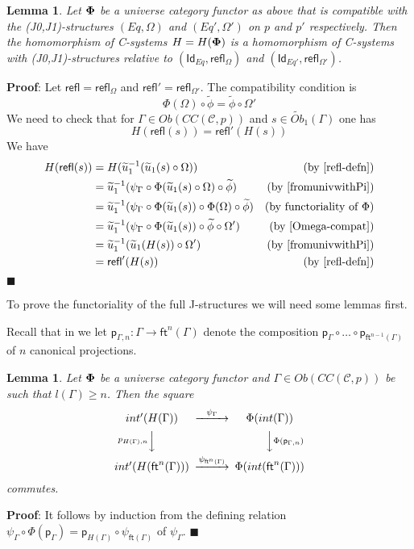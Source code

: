 \documentclass[12pt]{article}
\numberwithin{equation}{section}
\newenvironment{eq}{\begin{equation}}{\end{equation}}
\newenvironment{myproof}{{\bf Proof}:}{$\blacksquare$ \vskip 5mm }
\newtheorem{lemma}[proposition]{Lemma}
\newcommand{\by}[1]{\text{(by #1)}}
\newcommand{\sr}{\rightarrow}
\newcommand{\wt}{\widetilde}
\newcommand{\toCC}{CC} %
\newcommand{\C}{{\mathcal C}}  %
\newcommand{\ft}{\mathsf{ft}}
\newcommand{\p}{\mathsf{p}}
\newcommand{\Id}{\mathsf{Id}} %
\newcommand{\refl}{\mathsf{refl}}
\newcommand{\Obwt}{\wt{Ob}}
\begin{document}
\begin{lemma}
\label{2015.04.12.l2} Let ${\bf\Phi}$ be a universe category functor as above
that is compatible with the (J0,J1)-structures $(Eq,\Omega)$ and
$(Eq',\Omega')$ on $p$ and $p'$ respectively. Then the homomorphism of
C-systems $H=H({\bf\Phi})$ is a homomorphism of C-systems with
(J0,J1)-structures relative to $(\Id_{Eq},\refl_{\Omega})$ and
$(\Id_{Eq'},\refl_{\Omega'})$.
\end{lemma}
%
\begin{myproof}
Let $\refl=\refl_{\Omega}$ and $\refl'=\refl_{\Omega'}$. The compatibility
condition is
%
\begin{eq}
  \label{Omega-compat}
  \Phi(\Omega)\circ\wt{\phi}=\wt{\phi}\circ\Omega'
\end{eq}
%
We need to check that for $\Gamma\in Ob(\toCC({\C},p))$ and $s\in
\Obwt_1(\Gamma)$ one has
%
$$H(\refl(s))=\refl'(H(s))$$
%
We have
%
\begin{align*}
  H(\refl(s))
    & = H(\wt{u}_1^{-1}(\wt{u}_1(s)\circ\Omega)) & \by{\ref{refl-defn}} \\
    & = \wt{u}_1^{-1}(\psi_{\Gamma}\circ\Phi(\wt{u}_1(s)\circ\Omega)\circ\wt{\phi}) & \by{\cite[Lemma 6.1(2)]{fromunivwithPi}} \\
    & = \wt{u}_1^{-1}(\psi_{\Gamma}\circ\Phi(\wt{u}_1(s))\circ\Phi(\Omega)\circ \wt{\phi}) & \by{functoriality of $\Phi$} \\
    & = \wt{u}_1^{-1}(\psi_{\Gamma}\circ\Phi(\wt{u}_1(s))\circ\wt{\phi}\circ\Omega') & \by{\ref{Omega-compat}} \\
    & = \wt{u}_1^{-1}(\wt{u}_1(H(s))\circ\Omega') & \by{\cite[Lemma 6.1(2)]{fromunivwithPi}} \\
    & = \refl'(H(s)) & \by{\ref{refl-defn}}
\end{align*}
\end{myproof}
%

To prove the functoriality of the full J-structures we will need some lemmas
first.

Recall that in \cite{Csubsystems} we let $\p_{\Gamma,n}:\Gamma\sr \ft^n(\Gamma)$
denote the composition $\p_{\Gamma}\circ \dots\circ \p_{\ft^{n-1}(\Gamma)}$ of $n$ canonical projections.
%
\begin{lemma}
\label{2015.05.10.l1} Let ${\bf\Phi}$ be a universe category functor and
$\Gamma\in Ob(\toCC({\C},p))$ be such that $l(\Gamma)\ge n$. Then the
square
%
$$
\begin{CD}
int'(H(\Gamma)) @>\psi_{\Gamma}>> \Phi(int(\Gamma))\\ @Vp_{H(\Gamma),n} VV
@VV\Phi(\p_{\Gamma,n})V\\ int'(H(\ft^n(\Gamma))) @>\psi_{\ft^n(\Gamma)}>>
\Phi(int(\ft^n(\Gamma)))
\end{CD}
$$
%
commutes.
\end{lemma}
%
\begin{myproof}
It follows by induction from the defining relation
$\psi_{\Gamma}\circ \Phi(\p_{\Gamma})=\p_{H(\Gamma)}\circ \psi_{\ft(\Gamma)}$
of $\psi_{\Gamma}$.
\end{myproof}
\end{document}
